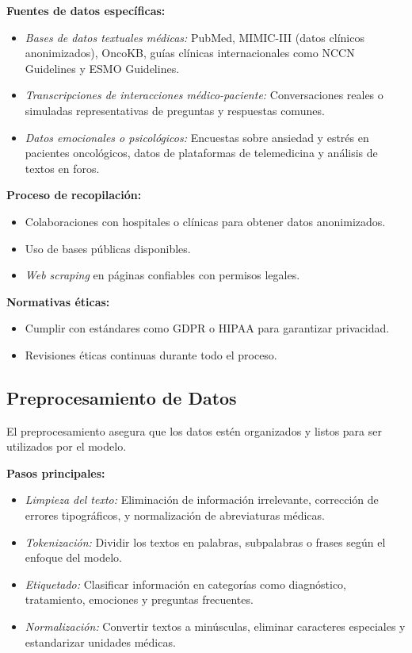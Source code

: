 \textbf{Fuentes de datos específicas:}
\begin{itemize}
    \item \textit{Bases de datos textuales médicas:} PubMed, MIMIC-III (datos clínicos anonimizados), OncoKB, guías clínicas internacionales como NCCN Guidelines y ESMO Guidelines.
    \item \textit{Transcripciones de interacciones médico-paciente:} Conversaciones reales o simuladas representativas de preguntas y respuestas comunes.
    \item \textit{Datos emocionales o psicológicos:} Encuestas sobre ansiedad y estrés en pacientes oncológicos, datos de plataformas de telemedicina y análisis de textos en foros.
\end{itemize}

\textbf{Proceso de recopilación:}
\begin{itemize}
    \item Colaboraciones con hospitales o clínicas para obtener datos anonimizados.
    \item Uso de bases públicas disponibles.
    \item \textit{Web scraping} en páginas confiables con permisos legales.
\end{itemize}

\textbf{Normativas éticas:}
\begin{itemize}
    \item Cumplir con estándares como GDPR o HIPAA para garantizar privacidad.
    \item Revisiones éticas continuas durante todo el proceso.
\end{itemize}

\subsection{Preprocesamiento de Datos}
El preprocesamiento asegura que los datos estén organizados y listos para ser utilizados por el modelo.

\textbf{Pasos principales:}
\begin{itemize}
    \item \textit{Limpieza del texto:} Eliminación de información irrelevante, corrección de errores tipográficos, y normalización de abreviaturas médicas.
    \item \textit{Tokenización:} Dividir los textos en palabras, subpalabras o frases según el enfoque del modelo.
    \item \textit{Etiquetado:} Clasificar información en categorías como diagnóstico, tratamiento, emociones y preguntas frecuentes.
    \item \textit{Normalización:} Convertir textos a minúsculas, eliminar caracteres especiales y estandarizar unidades médicas.
\end{itemize}

